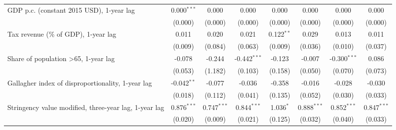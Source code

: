 \begin{table}[htbp]
\begin{tabular}{lccccccc}
      GDP p.c. (constant 2015 USD), 1-year lag                                           & 0.000$^{***}$ & 0.000                     & 0.000           & 0.000            & 0.000           & 0.000           & 0.000\\   
                                                                                         & (0.000)       & (0.000)                   & (0.000)         & (0.000)          & (0.000)         & (0.000)         & (0.000)\\   
      Tax revenue (\% of GDP), 1-year lag                                                & 0.011         & 0.020                     & 0.021           & 0.122$^{**}$     & 0.029           & 0.013           & 0.011\\   
                                                                                         & (0.009)       & (0.084)                   & (0.063)         & (0.009)          & (0.036)         & (0.010)         & (0.037)\\   
      Share of population >65, 1-year lag                                                & -0.078        & -0.244                    & -0.442$^{***}$  & -0.123           & -0.007          & -0.300$^{***}$  & 0.086\\   
                                                                                         & (0.053)       & (1.182)                   & (0.103)         & (0.158)          & (0.050)         & (0.070)         & (0.073)\\   
      Gallagher index of disproportionality, 1-year lag                                  & -0.042$^{**}$ & -0.077                    & -0.036          & -0.358           & -0.016          & -0.028          & -0.030\\   
                                                                                         & (0.018)       & (0.112)                   & (0.041)         & (0.135)          & (0.052)         & (0.030)         & (0.033)\\   
      Stringency value modified, three-year lag, 1-year lag                              & 0.876$^{***}$ & 0.747$^{***}$             & 0.844$^{***}$   & 1.036$^{*}$      & 0.888$^{***}$   & 0.852$^{***}$   & 0.847$^{***}$\\   
                                                                                         & (0.020)       & (0.009)                   & (0.021)         & (0.125)          & (0.032)         & (0.040)         & (0.033)\\   

\end{tabular}
\end{table}
